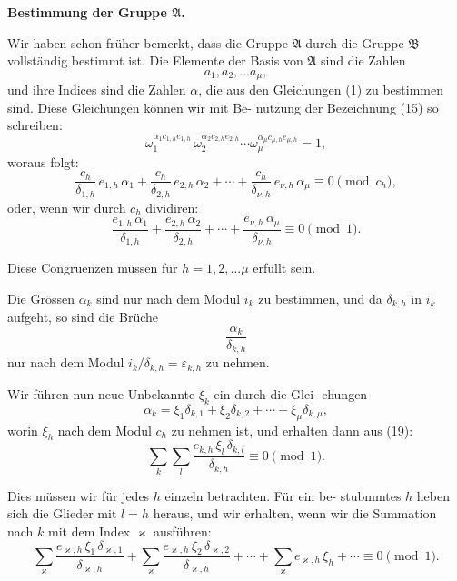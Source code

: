 \documentclass[12pt,a4paper]{article}
\begin{document}
\medskip
\begin{center}\textbf{Bestimmung der Gruppe $\mathfrak{A}$.}\end{center}

Wir haben schon fr\"uher bemerkt, dass die Gruppe $\mathfrak{A}$ durch die
Gruppe $\mathfrak{B}$ vollst\"andig bestimmt ist. Die Elemente der Basis von
$\mathfrak{A}$ sind die Zahlen
\[a_1, a_2, \ldots a_\mu,\]
und ihre Indices sind die Zahlen $\alpha$, die aus den Gleichungen (1)
zu bestimmen sind. Diese Gleichungen k\"onnen wir mit Be-
nutzung der Bezeichnung (15) so schreiben:
\[\omega_1^{\alpha_1 c_{1,h} e_{1,h}}\, \omega_2^{\alpha_2 c_{2,h} e_{2,h}} \cdots \omega_\mu^{\alpha_\mu c_{\mu,h} e_{\mu,h}} = 1,\]
woraus folgt:
\[\frac{c_h}{\delta_{1,h}}\, e_{1,h}\, \alpha_1 + \frac{c_h}{\delta_{2,h}}\, e_{2,h}\, \alpha_2 + \cdots + \frac{c_h}{\delta_{\nu,h}}\, e_{\nu,h}\, \alpha_\mu \equiv 0 \pmod{c_h},\]
oder, wenn wir durch $c_h$ dividiren:
\begin{equation}\label{eq:k21-19}
\frac{e_{1,h}\, \alpha_1}{\delta_{1,h}} + \frac{e_{2,h}\, \alpha_2}{\delta_{2,h}} + \cdots + \frac{e_{\nu,h}\, \alpha_\mu}{\delta_{\nu,h}} \equiv 0 \pmod{1}.
\end{equation}

Diese Congruenzen m\"ussen f\"ur $h = 1, 2, \ldots \mu$ erf\"ullt sein.

Die Gr\"ossen $\alpha_k$ sind nur nach dem Modul $i_k$ zu bestimmen,
und da $\delta_{k,h}$ in $i_k$ aufgeht, so sind die Br\"uche
\[\frac{\alpha_k}{\delta_{k,h}}\]
nur nach dem Modul $i_k/\delta_{k,h} = \varepsilon_{k,h}$ zu nehmen.

Wir f\"uhren nun neue Unbekannte $\xi_k$ ein durch die Glei-
chungen
\begin{equation}\label{eq:k21-20}
\alpha_k = \xi_1 \delta_{k,1} + \xi_2 \delta_{k,2} + \cdots + \xi_\mu \delta_{k,\mu},
\end{equation}
worin $\xi_h$ nach dem Modul $c_h$ zu nehmen ist, und erhalten
dann aus (19):
\[\sum_k \sum_l \frac{e_{k,h}\, \xi_l\, \delta_{k,l}}{\delta_{k,h}} \equiv 0 \pmod{1}.\]

Dies m\"ussen wir f\"ur jedes $h$ einzeln betrachten. F\"ur ein be-
stubmmtes $h$ heben sich die Glieder mit $l = h$ heraus, und
wir erhalten, wenn wir die Summation nach $k$ mit dem Index
$\varkappa$ ausf\"uhren:
\begin{equation}\label{eq:k21-21}
\sum_\varkappa \frac{e_{\varkappa,h}\, \xi_1\, \delta_{\varkappa,1}}{\delta_{\varkappa,h}} +
\sum_\varkappa \frac{e_{\varkappa,h}\, \xi_2\, \delta_{\varkappa,2}}{\delta_{\varkappa,h}} + \cdots +
\sum_\varkappa e_{\varkappa,h}\, \xi_h + \cdots \equiv 0 \pmod{1}.
\end{equation}
\end{document}
